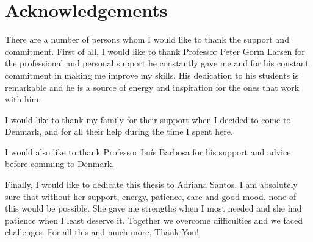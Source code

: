 \chapter*{Acknowledgements}

There are a number of persons whom I would like to thank the support and commitment. First of all, I would like to thank Professor Peter Gorm Larsen for the professional and personal support he constantly gave me and for his constant commitment in making me improve my skills. His dedication to his students is remarkable and he is a source of energy and inspiration for the ones that work with him.

I would like to thank my family for their support when I decided to come to Denmark, and for all their help during the time I spent here.

I would also like to thank Professor Lu\'{i}s Barbosa for his support and advice before comming to Denmark.

Finally, I would like to dedicate this thesis to Adriana Santos. I am absolutely sure that without her support, energy, patience, care and good mood, none of this would be possible. She gave me strengths when I most needed and she had patience when I least deserve it. Together we overcome difficulties and we faced challenges. For all this and much more, Thank You!

